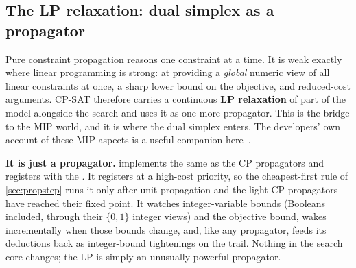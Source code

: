 \subsection{The LP relaxation: dual simplex as a propagator}\label{sec:lp}

Pure constraint propagation reasons one constraint at a time. It is weak exactly
where linear programming is strong: at providing a \emph{global} numeric view of
all linear constraints at once, a sharp lower bound on the objective, and
reduced-cost arguments. CP-SAT therefore carries a continuous \textbf{LP
relaxation} of part of the model alongside the search and uses it as one more
propagator. This is the bridge to the MIP world, and it is where the dual
simplex enters. The developers' own account of these MIP aspects is a useful
companion here~\cite{didier2025mipaspects}.

\textbf{It is just a propagator.}
implements the same  as the CP
propagators and registers with the
. It registers at a high-cost
priority, so the cheapest-first rule of \cref{sec:propstep} runs it only
after unit propagation and the light CP propagators have reached their fixed
point. It watches integer-variable bounds (Booleans included, through their
$\{0,1\}$ integer views) and the objective bound, wakes
incrementally when those bounds change, and, like any propagator, feeds its
deductions back as integer-bound tightenings on the trail. Nothing in the search
core changes; the LP is simply an unusually powerful propagator.

